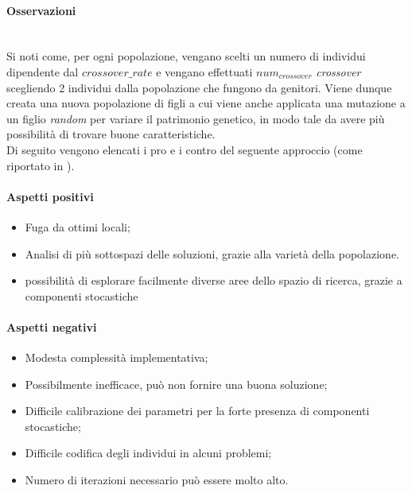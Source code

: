 \noindent \paragraph{Osservazioni}\hfill\\
Si noti come, per ogni popolazione, vengano scelti un numero di individui dipendente dal {$crossover\_rate$}
e vengano effettuati {$num_{crossover}$} \textit{crossover} scegliendo 2 individui dalla popolazione che fungono da genitori.
Viene dunque creata una nuova popolazione di figli a cui viene anche applicata una mutazione a un figlio \textit{random} per
variare il patrimonio genetico, in modo tale da avere più possibilità di trovare buone caratteristiche.\\
Di seguito vengono elencati i pro e i contro del seguente approccio (come riportato in \cite{siteP:articolo-alg-gen} \cite{siteQ:paper-lo-go}).\\

\noindent \paragraph{Aspetti positivi}
\begin{itemize}
    \item Fuga da ottimi locali;
    \item Analisi di più sottospazi delle soluzioni, grazie alla varietà della popolazione.
    \item possibilità di esplorare facilmente diverse aree dello spazio di ricerca, grazie a componenti stocastiche
\end{itemize}

\noindent \paragraph{Aspetti negativi}
\begin{itemize}
    \item Modesta complessità implementativa;
    \item Possibilmente inefficace, può non fornire una buona soluzione;
    \item Difficile calibrazione dei parametri per la forte presenza di componenti stocastiche;
    \item Difficile codifica degli individui in alcuni problemi;
    \item Numero di iterazioni necessario può essere molto alto.
\end{itemize}
\newpage
